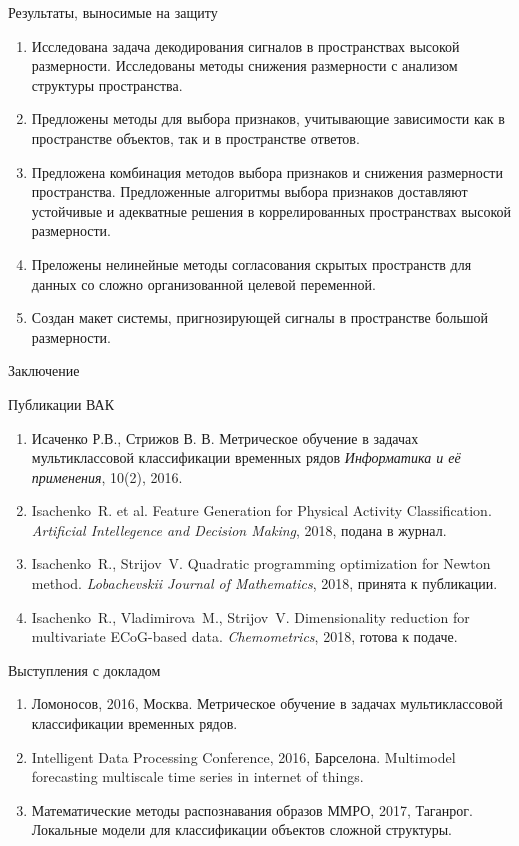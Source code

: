 \documentclass[9pt]{beamer}
\begin{document}
\begin{frame}{Результаты, выносимые на защиту}
\begin{enumerate}
	\item Исследована задача декодирования сигналов в пространствах высокой размерности. Исследованы методы снижения размерности с анализом структуры пространства.
	\vfill
	\item Предложены методы для выбора признаков, учитывающие зависимости как в пространстве объектов, так и в пространстве ответов.
	\vfill
	\item Предложена комбинация методов выбора признаков и снижения размерности пространства. Предложенные алгоритмы выбора признаков доставляют устойчивые и адекватные решения в коррелированных пространствах высокой размерности.
	\vfill
	\item Преложены нелинейные методы согласования скрытых пространств для данных со сложно организованной целевой переменной.
	\vfill
	\item Создан макет системы, пригнозирующей сигналы в пространстве большой размерности.
\end{enumerate}
\end{frame}
\begin{frame}{Заключение}
	\begin{block}{Публикации ВАК}
		\vspace{-0.2cm}
		\begin{enumerate}
			\item Исаченко Р.В., Стрижов В. В. Метрическое обучение в задачах мультиклассовой классификации временных рядов \emph{Информатика и её применения}, 10(2), 2016.
			\item Isachenko~R. et al. Feature Generation for Physical Activity Classification. \emph{Artificial Intellegence and Decision Making}, 2018, подана в журнал.
			\item Isachenko~R., Strijov~V. Quadratic programming optimization for Newton method. \emph{Lobachevskii Journal of Mathematics}, 2018, принята к публикации.
			\item Isachenko~R., Vladimirova~M., Strijov~V. Dimensionality reduction for multivariate ECoG-based data. \emph{Chemometrics}, 2018, готова к подаче.
		\end{enumerate}
	\end{block}
\vspace{-0.2cm}
\begin{block}{Выступления с докладом}
	\vspace{-0.2cm}
	\begin{enumerate}
		\item Ломоносов, 2016, Москва. Метрическое обучение в задачах мультиклассовой классификации временных рядов.
		\item Intelligent Data Processing Conference, 2016, Барселона. Multimodel forecasting multiscale time series in internet of things.
		\item Математические методы распознавания образов ММРО, 2017, Таганрог. Локальные модели для классификации объектов сложной структуры.
	\end{enumerate}
\end{block}
\end{frame}
\end{document}
